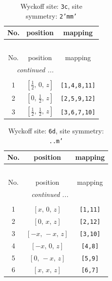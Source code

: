 \documentclass[fleqn,8pt]{jsarticle}
\begin{document}
\begin{longtable}{ccc}
\caption{Wyckoff site: {\tt 3c}, site symmetry: {\tt 2'mm'}}
 \\
 \hline \hline
No. & position & mapping \\ \hline \endfirsthead

\multicolumn{2}{l}{\tablename\ \thetable{}} \\
 \hline \hline
No. & position & mapping \\ \hline \endhead

 \hline \hline
\multicolumn{2}{r}{\footnotesize\it continued ...} \\ \endfoot

 \hline \hline
\multicolumn{2}{r}{} \\ \endlastfoot

1 & $\left[ \frac{1}{2},\, 0,\, z \right]$ & {\tt [1,4,8,11]} \\ \hline
2 & $\left[ 0,\, \frac{1}{2},\, z \right]$ & {\tt [2,5,9,12]} \\ \hline
3 & $\left[ \frac{1}{2},\, \frac{1}{2},\, z \right]$ & {\tt [3,6,7,10]} \\
\end{longtable}
\renewcommand{\arraystretch}{1.2}
\begin{longtable}{ccc}
\caption{Wyckoff site: {\tt 6d}, site symmetry: {\tt ..m'}}
 \\
 \hline \hline
No. & position & mapping \\ \hline \endfirsthead

\multicolumn{2}{l}{\tablename\ \thetable{}} \\
 \hline \hline
No. & position & mapping \\ \hline \endhead

 \hline \hline
\multicolumn{2}{r}{\footnotesize\it continued ...} \\ \endfoot

 \hline \hline
\multicolumn{2}{r}{} \\ \endlastfoot

1 & $\left[ x,\, 0,\, z \right]$ & {\tt [1,11]} \\ \hline
2 & $\left[ 0,\, x,\, z \right]$ & {\tt [2,12]} \\ \hline
3 & $\left[ - x,\, - x,\, z \right]$ & {\tt [3,10]} \\ \hline
4 & $\left[ - x,\, 0,\, z \right]$ & {\tt [4,8]} \\ \hline
5 & $\left[ 0,\, - x,\, z \right]$ & {\tt [5,9]} \\ \hline
6 & $\left[ x,\, x,\, z \right]$ & {\tt [6,7]} \\
\end{longtable}
\end{document}
